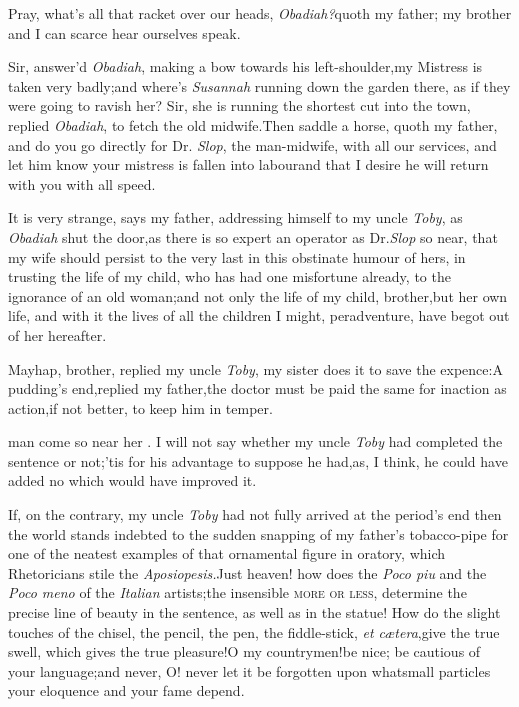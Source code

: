 \documentclass{article}
\begin{document}
Pray, what’s all that racket over our heads,
\textit{Obadiah?}\tsk quoth my father;\tsk\break
my brother and I can scarce hear ourselves speak.

Sir, answer’d \textit{Obadiah}, making a bow
towards his left-shoulder,\tsk my Mistress
is taken very badly;\tsk and where’s \textit{Susannah}
running down the garden there,\pb
as if they were going to ravish her?\tsh\break
Sir, she is running
the shortest cut into the town, replied \textit{Obadiah}, to
fetch the old midwife.\tsh Then saddle a horse, quoth my
father, and do you go directly for Dr.\@
\textit{Slop}, the man-midwife, with all our services,\tsk
and let him know your mistress is fallen into labour\tsk and
that I desire he will return with you with all speed.

It is very strange, says my father, addressing himself to my
uncle \textit{Toby}, as \textit{Obadiah} shut the door,\tsh as there
is so expert an operator as Dr.\@ \textit{Slop} so
near,\tsk\break
that my
wife should persist to the very last in this obstinate humour of
hers, in trusting the life of my child, who has had one misfortune
already, to the ignorance of an old woman;\tsh and not
only the life of my child, brother,\tsh but her own life,
and with it the lives of all the children I might, peradventure,
have begot out of her hereafter.

Mayhap, brother, replied my uncle\break
\textit{Toby}, my sister does it to save the expence:\tsk A
pudding’s end,\tsk replied my father,\tsh the doctor must be
paid the same for inaction as action,\tsk if not better,\tsk
to keep him in temper.

\noindent
{}
man come so near her \astiv. I will
not say whether my uncle \textit{Toby} had completed the
sentence or not;\tsh ’tis for his advantage to suppose he
had,\tsh\break as, I think, he could have added no\pb
{} which would have improved it.

If, on the contrary, my uncle \textit{Toby} had not fully arrived
at the period’s end\tsk\break
then the world stands indebted to
the sudden snapping of my father’s tobacco-pipe for one of
the neatest examples of that ornamental figure in oratory, which
Rhetoricians stile the \textit{Aposiopesis.}\tsh Just
heaven! how does the \textit{Poco piu} and the \textit{Poco meno} of
the \textit{Italian} artists;\tsk the insensible \textsc{more or
less}, determine the precise line of beauty in the sentence,
as well as in the statue! How do the slight touches of the chisel,
the pencil, the pen, the fiddle-stick, \textit{et
cætera},\tsk give the true swell, which gives the true
pleasure!\tsk O my countrymen!\tsk be nice; be cautious of your
language;\tsh and never, O! never let it be forgotten upon
what\pb small
particles your eloquence and your fame depend.
\end{document}
